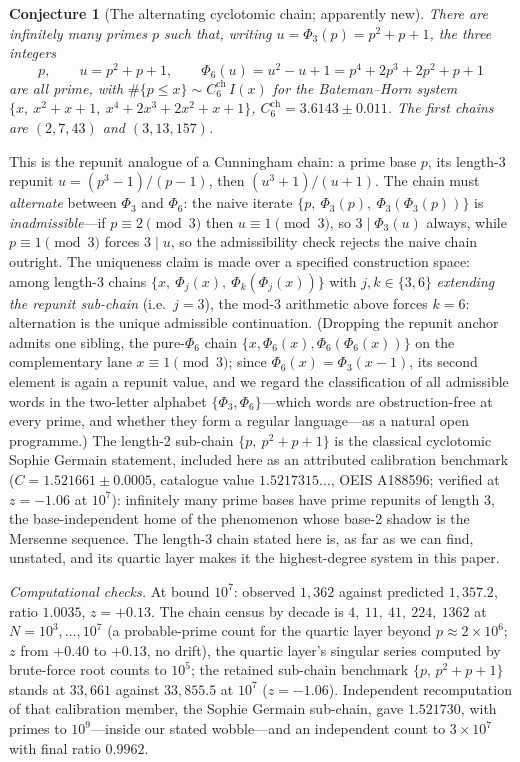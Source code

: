 \documentclass[11pt]{article}
\newtheorem{conjecture}{Conjecture}
\theoremstyle{definition}
\begin{document}
\setcounter{conjecture}{23}%
\begin{conjecture}[The alternating cyclotomic chain; apparently
new]\label{c6}
There are infinitely many primes $p$ such that, writing
$u=\Phi_3(p)=p^2+p+1$, the three integers
\[
p,\qquad u=p^2+p+1,\qquad
\Phi_6(u)=u^2-u+1=p^4+2p^3+2p^2+p+1
\]
are all prime, with
$\#\{p\le x\}\sim C_6^{\mathrm{ch}}\,I(x)$ for the Bateman--Horn
system $\{x,\ x^2+x+1,\ x^4+2x^3+2x^2+x+1\}$,
$C_6^{\mathrm{ch}}=3.6143\pm0.011$.  The first chains are
$(2,7,43)$ and $(3,13,157)$.
\end{conjecture}

This is the repunit analogue of a Cunningham chain: a prime base $p$,
its length-3 repunit $u=(p^3-1)/(p-1)$, then $(u^3+1)/(u+1)$.  The
chain must \emph{alternate} between $\Phi_3$ and $\Phi_6$: the naive
iterate $\{p,\ \Phi_3(p),\ \Phi_3(\Phi_3(p))\}$ is
\emph{inadmissible}---if $p\equiv2\pmod3$ then $u\equiv1\pmod3$, so
$3\mid\Phi_3(u)$ always, while $p\equiv1\pmod 3$ forces $3\mid u$, so
the admissibility check rejects the naive chain outright.
The uniqueness claim is made over a specified construction space:
among length-3 chains
$\{x,\ \Phi_j(x),\ \Phi_k(\Phi_j(x))\}$ with $j,k\in\{3,6\}$
\emph{extending the repunit sub-chain} (i.e.\ $j=3$), the
mod-3 arithmetic above forces $k=6$: alternation is the unique
admissible continuation.  (Dropping the repunit anchor admits one
sibling, the pure-$\Phi_6$ chain $\{x,\Phi_6(x),\Phi_6(\Phi_6(x))\}$
on the complementary lane $x\equiv1\pmod3$; since
$\Phi_6(x)=\Phi_3(x-1)$, its second element is again a repunit value,
and we regard the classification of all admissible words in the
two-letter alphabet $\{\Phi_3,\Phi_6\}$---which words are
obstruction-free at every prime, and whether they form a regular
language---as a natural open programme.)  The length-2 sub-chain
$\{p,\ p^2+p+1\}$ is the classical cyclotomic Sophie Germain
statement, included here as an attributed calibration benchmark
($C=1.521661\pm0.0005$, catalogue value $1.5217315\ldots$,
OEIS A188596; verified at $z=-1.06$ at $10^7$): infinitely many prime bases
have prime
repunits of length $3$, the base-independent home of the phenomenon
whose base-2 shadow is the Mersenne sequence.  The length-3 chain
stated here is, as far as we can find, unstated, and its quartic layer
makes it the highest-degree system in this paper.

\emph{Computational checks.}  At bound $10^{7}$: observed $1{,}362$ against
predicted $1{,}357.2$, ratio $1.0035$, $z=+0.13$.  The chain census by
decade is $4,\ 11,\ 41,\ 224,\ 1362$ at $N=10^3,\dots,10^7$ (a
probable-prime count for the quartic layer beyond
$p\approx2\times10^6$; $z$ from $+0.40$ to $+0.13$, no drift), the
quartic layer's singular series computed by brute-force root counts to
$10^5$; the retained sub-chain benchmark $\{p,\,p^2+p+1\}$ stands at
$33{,}661$ against $33{,}855.5$ at $10^7$ ($z=-1.06$).  Independent
recomputation of that calibration member, the Sophie Germain
sub-chain, gave $1.521730$, with primes to $10^9$---inside our stated
wobble---and an independent count to $3\times10^7$ with final ratio
$0.9962$.
\end{document}
